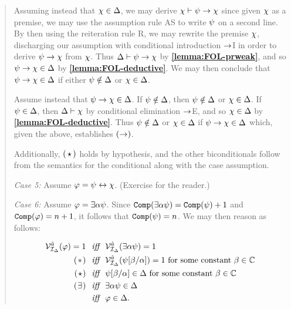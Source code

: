 \begin{quote}
  Assuming instead that $\chi\in\Delta$, we may derive $\chi\vdash\psi\rightarrow\chi$ since given $\chi$ as a premise, we may use the assumption rule AS to write $\psi$ on a second line.
  By then using the reiteration rule R, we may rewrite the premise $\chi$, discharging our assumption with conditional introduction $\rightarrow$I in order to derive $\psi\rightarrow\chi$ from $\chi$. 
  Thus $\Delta\vdash\psi\rightarrow\chi$ by \textbf{\ref{lemma:FOL-prweak}}, and so $\psi\rightarrow\chi\in\Delta$ by \textbf{\ref{lemma:FOL-deductive}}.
  We may then conclude that $\psi\rightarrow\chi\in\Delta$ if either $\psi\notin\Delta$ or $\chi\in\Delta$.

  Assume instead that $\psi\rightarrow\chi\in\Delta$.
  If $\psi\notin\Delta$, then $\psi\notin\Delta$ or $\chi\in\Delta$.
  If $\psi\in\Delta$, then $\Delta\vdash\chi$ by conditional elimination $\rightarrow$E, and so $\chi\in\Delta$ by \textbf{\ref{lemma:FOL-deductive}}.
  Thus $\psi\notin\Delta$ or $\chi\in\Delta$ if $\psi\rightarrow\chi\in\Delta$ which, given the above, establishes $(\rightarrow)$.  

  Additionally, $(\hspace{1.6pt}\star\hspace{1.6pt})$ holds by hypothesis, and the other biconditionals follow from the semantics for the conditional along with the case assumption.

  \textit{Case 5:}
  Assume $\varphi=\psi\leftrightarrow\chi$. (Exercise for the reader.)

  \textit{Case 6:}
  Assume $\varphi=\exists \alpha\psi$.
  Since $\texttt{Comp}(\exists \alpha\psi)=\texttt{Comp}(\psi)+1$ and $\texttt{Comp}(\varphi)=n+1$, it follows that $\texttt{Comp}(\psi)=n$.
  We may then reason as follows:

  \vspace{-.2in}
  \begin{align*}
    \mathcal{V}_{\mathcal{I}_{\Delta}}^{\hat{a}}(\varphi)=1 &\textit{ ~iff~ } \mathcal{V}_{\mathcal{I}_{\Delta}}^{\hat{a}}(\exists \alpha\psi)=1\\
      (\hspace{1pt}\ast\hspace{1pt}) &\textit{ ~iff~ } \mathcal{V}_{\mathcal{I}_{\Delta}}^{\hat{a}}(\psi[\beta/\alpha])=1 \text{ for some constant } \beta\in\mathbb{C}\\
      (\hspace{.7pt}\star\hspace{.7pt}) &\textit{ ~iff~ } \psi[\beta/\alpha]\in\Delta \text{ for some constant } \beta\in\mathbb{C}\\ 
      (\hspace{.7pt}\exists\hspace{.7pt}) &\textit{ ~iff~ } \exists \alpha\psi\in\Delta \\
      &\textit{ ~iff~ } \varphi\in\Delta.
  \end{align*}


\end{quote}
